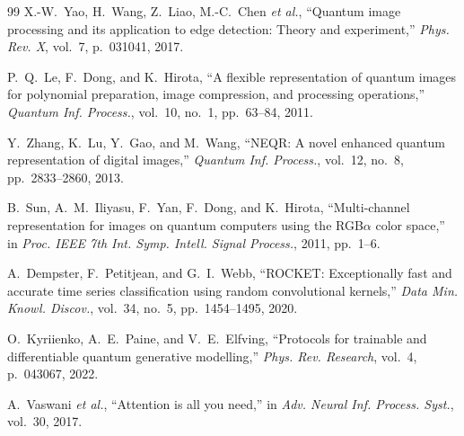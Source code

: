 \documentclass[conference,compsoc]{IEEEtran}
\begin{document}
\begin{thebibliography}{99}
X.-W.~Yao, H.~Wang, Z.~Liao, M.-C.~Chen \emph{et al.},
``Quantum image processing and its application to edge detection: Theory and experiment,''
\emph{Phys. Rev. X}, vol.~7, p.~031041, 2017.

P.~Q.~Le, F.~Dong, and K.~Hirota,
``A flexible representation of quantum images for polynomial preparation, image compression, and processing operations,''
\emph{Quantum Inf. Process.}, vol.~10, no.~1, pp.~63--84, 2011.

Y.~Zhang, K.~Lu, Y.~Gao, and M.~Wang,
``{NEQR}: A novel enhanced quantum representation of digital images,''
\emph{Quantum Inf. Process.}, vol.~12, no.~8, pp.~2833--2860, 2013.

B.~Sun, A.~M.~Iliyasu, F.~Yan, F.~Dong, and K.~Hirota,
``Multi-channel representation for images on quantum computers using the {RGB}$\alpha$ color space,''
in \emph{Proc. IEEE 7th Int. Symp. Intell. Signal Process.}, 2011, pp.~1--6.

A.~Dempster, F.~Petitjean, and G.~I.~Webb,
``{ROCKET}: Exceptionally fast and accurate time series classification using random convolutional kernels,''
\emph{Data Min. Knowl. Discov.}, vol.~34, no.~5, pp.~1454--1495, 2020.

O.~Kyriienko, A.~E.~Paine, and V.~E.~Elfving,
``Protocols for trainable and differentiable quantum generative modelling,''
\emph{Phys. Rev. Research}, vol.~4, p.~043067, 2022.

A.~Vaswani \emph{et al.},
``Attention is all you need,''
in \emph{Adv. Neural Inf. Process. Syst.}, vol.~30, 2017.

\end{thebibliography}
\end{document}
